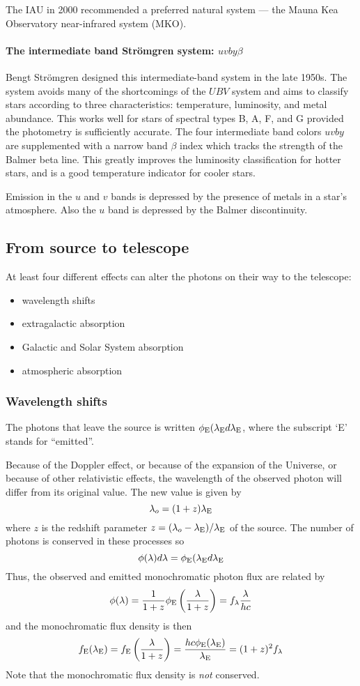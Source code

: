 \documentclass{article}
\begin{document}
The IAU in 2000 recommended a preferred natural system --- the Mauna
Kea Observatory near-infrared system (MKO).
\paragraph{The intermediate band Str\"omgren system: $uvby\beta$}
Bengt Str\"omgren designed this intermediate-band system in the late
1950s. The system avoids many of the shortcomings of the $UBV$ system
and aims to classify stars according to three characteristics:
temperature, luminosity, and metal abundance. This works well for
stars of spectral types B, A, F, and G provided the photometry is
sufficiently accurate. The four intermediate band colors $uvby$ are
supplemented with a narrow band $\beta$ index which tracks the
strength of the Balmer beta line. This greatly improves the
luminosity classification for hotter stars, and is a good temperature
indicator for cooler stars.

Emission in the $u$ and $v$ bands is depressed by the presence of
metals in a star's atmosphere. Also the $u$ band is depressed by the
Balmer discontinuity. 

\subsection{From source to telescope}
At least four different effects can alter the photons on their way to
the telescope:
\begin{itemize}
\item wavelength shifts
\item extragalactic absorption
\item Galactic and Solar System absorption
\item atmospheric absorption
\end{itemize}
\subsubsection{Wavelength shifts}
The photons that leave the source is written $\phi_{\rm
  E}(\lambda_{\rm E}d\lambda_{\rm E}$, where the subscript `E' stands
for ``emitted''. 

Because of the Doppler effect, or because of the expansion of the
Universe, or because of other relativistic effects, the wavelength of
the observed photon will differ from its original value. The new value
is given by
\[
\lambda_o=(1+z)\lambda_{\rm E}
\]
where $z$ is the redshift parameter $z={(\lambda_o-\lambda_{\rm
  E})/\lambda_{\rm E}}$ of the source. The number of photons is
conserved in these processes so 
\[
\phi(\lambda)d\lambda=\phi_{\rm E}(\lambda_{\rm E}d\lambda_{\rm E}
\]
Thus, the observed and emitted monochromatic photon flux are related by 
\[
\phi(\lambda)=\frac{1}{1+z}\phi_{\rm E}\left(\frac{\lambda}{1+z}\right)=f_\lambda\frac{\lambda}{hc}
\]
and the monochromatic flux density is then
\[
f_{\rm E}(\lambda_{\rm E})=f_{\rm
  E}\left(\frac{\lambda}{1+z}\right)=\frac{hc\phi_{\rm E}(\lambda_{\rm
    E})}{\lambda_{\rm E}}=(1+z)^2f_\lambda
\]
Note that the monochromatic flux density is {\it not} conserved.
\end{document}
